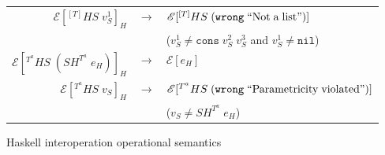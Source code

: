 \begin{figure}
\begin{center}
\begin{tabular}{rcl}
$\mathscr{E}[^{[T]}HS\;v_{S}^{1}]_{H}$ & $\rightarrow$ & $\mathscr{E}[^{[T]}HS\;(\mathtt{wrong}\;\mathrm{``Not\;a\;list"})]$ \\
&& ($v_{S}^{1}\neq\mathtt{cons}\;v_{S}^{2}\;v_{S}^{3}$ and $v_{S}^{1}\neq\mathtt{nil}$) \\
$\mathscr{E}[^{T^{a}}HS\;(SH^{T^{a}}\;e_{H})]_{H}$ & $\rightarrow$ & $\mathscr{E}[e_{H}]$ \\
$\mathscr{E}[^{T^{a}}HS\;v_{S}]_{H}$ & $\rightarrow$ & $\mathscr{E}[^{T^{a}}HS\;(\mathtt{wrong}\;\mathrm{``Parametricity\;violated"})]$ \\
&& ($v_{S}\neq SH^{T^{a}}\;e_{H}$)
\end{tabular}
\end{center}
\caption{Haskell interoperation operational semantics}
\label{fig:hios}
\end{figure}
